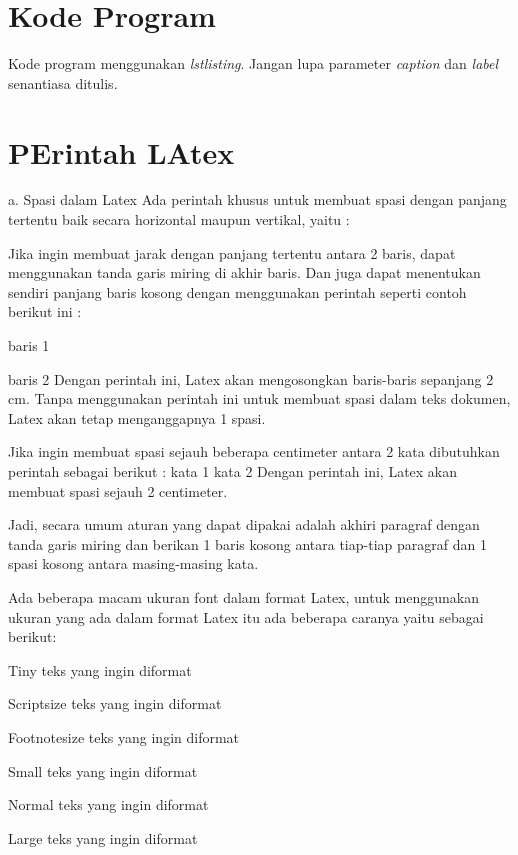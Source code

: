 \section{Kode Program}
Kode program menggunakan \textit{lstlisting}. Jangan lupa parameter \textit{caption} dan \textit{label} senantiasa ditulis.


\section {PErintah LAtex}
a. Spasi dalam Latex
Ada perintah khusus untuk membuat spasi dengan panjang tertentu baik secara horizontal maupun vertikal, yaitu :

Jika ingin membuat jarak dengan panjang tertentu antara 2 baris, dapat menggunakan tanda garis miring di akhir baris. Dan juga dapat menentukan sendiri panjang baris kosong dengan menggunakan perintah seperti contoh berikut ini :

baris 1

\vspace{2cm}

baris 2
Dengan perintah ini, Latex akan mengosongkan baris-baris sepanjang 2 cm. Tanpa menggunakan perintah ini untuk membuat spasi dalam teks dokumen, Latex akan tetap menganggapnya 1 spasi.

Jika ingin membuat spasi sejauh beberapa centimeter antara 2 kata dibutuhkan perintah sebagai berikut :
kata 1 \hspace{2cm} kata 2
Dengan perintah ini, Latex akan membuat spasi sejauh 2 centimeter.

Jadi, secara umum aturan yang dapat dipakai adalah akhiri paragraf dengan tanda garis miring dan berikan 1 baris kosong antara tiap-tiap paragraf dan 1 spasi kosong antara masing-masing kata.

Ada beberapa macam ukuran font dalam format Latex, untuk menggunakan ukuran yang ada dalam format Latex itu ada beberapa caranya yaitu sebagai berikut:

Tiny
{\tiny teks yang ingin diformat }

Scriptsize
{\scriptsize teks yang ingin diformat }

Footnotesize
{\footnotesize teks yang ingin diformat }

Small
{\small teks yang ingin diformat }

Normal
{\normalsize teks yang ingin diformat }

Large
{\large teks yang ingin diformat }

